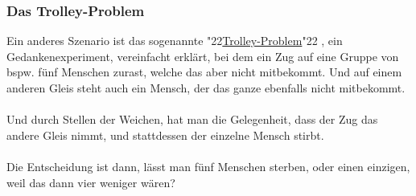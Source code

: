 \documentclass[12pt,a5paper]{article}
\newcommand{\q}[1]{\char"22{#1}\char"22 }
\begin{document}
	\subsubsection{Das Trolley-Problem}
		Ein anderes Szenario ist das sogenannte \q{\href{https://de.wikipedia.org/wiki/Trolley-Problem}{Trolley-Problem}},
		ein Gedankenexperiment,
		vereinfacht erkl\"art,
		bei dem ein Zug auf eine Gruppe von bspw. f\"unf Menschen zurast,
		welche das aber nicht mitbekommt.
		Und auf einem anderen Gleis steht auch ein Mensch,
		der das ganze ebenfalls nicht mitbekommt.
		\\
		\\
		Und durch Stellen der Weichen,
		hat man die Gelegenheit,
		dass der Zug das andere Gleis nimmt,
		und stattdessen der einzelne Mensch stirbt.
		\\
		\\
		Die Entscheidung ist dann,
		l\"asst man f\"unf Menschen sterben,
		oder einen einzigen,
		weil das dann vier weniger w\"aren?
		
\end{document}
